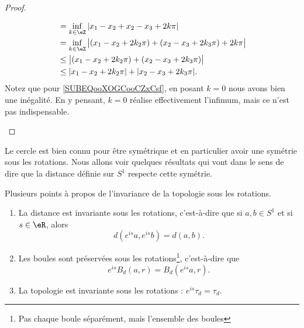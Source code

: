 \begin{proof}
\begin{enumerate}
\begin{itemize}
\begin{subequations}
\begin{align}
					                       & =\inf_{k\in \eZ}| x_1-x_2+x_2-x_3+2k\pi |                                                       \\
					                       & =\inf_{k\in \eZ}\big|  (x_1-x_2+2k_2\pi)+(x_2-x_3+2k_3\pi) +2k\pi \big|                         \\
					                       & \leq	\big|  (x_1-x_2+2k_2\pi)+(x_2-x_3+2k_3\pi) \big|                \label{SUBEQooXOGCooCZxCsf} \\
					                       & \leq | x_1-x_2+2k_2\pi |+| x_2-x_3+2k_3\pi |.
				            \end{align}
			            \end{subequations}
			            Notez que pour \eqref{SUBEQooXOGCooCZxCsf}, en posant \( k=0\) nous avons bien une inégalité. En y pensant, \( k=0\) réalise effectivement l'infimum, mais ce n'est pas indispensable.
		      \end{itemize}
	\end{enumerate}
\end{proof}

Le cercle est bien connu pour être symétrique et en particulier avoir une symétrie sous les rotations. Nous allons voir quelques résultats qui vont dans le sens de dire que la distance définie sur \( S^1\) respecte cette symétrie.

\begin{lemma}       \label{LEMooCQCAooAEctbe}
	Plusieurs points à propos de l'invariance de la topologie sous les rotations.
	\begin{enumerate}
		\item
		      La distance est invariante sous les rotations, c'est-à-dire que si \( a,b\in S^1\) et si \( s\in \eR\), alors
		      \begin{equation}
			      d( e^{is}a, e^{is}b)=d(a,b).
		      \end{equation}
		\item       \label{ITEMooCIPYooTyPQLj}
		      Les boules sont préservées sous les rotations\footnote{Pas chaque boule séparément, mais l'ensemble des boules}, c'est-à-dire que
		      \begin{equation}
			      e^{is}B_d(a,r)=B_d( e^{is}a,r).
		      \end{equation}
		\item
		      La topologie est invariante sous les rotations : \(  e^{is}\tau_d=\tau_d\).
	\end{enumerate}
\end{lemma}

